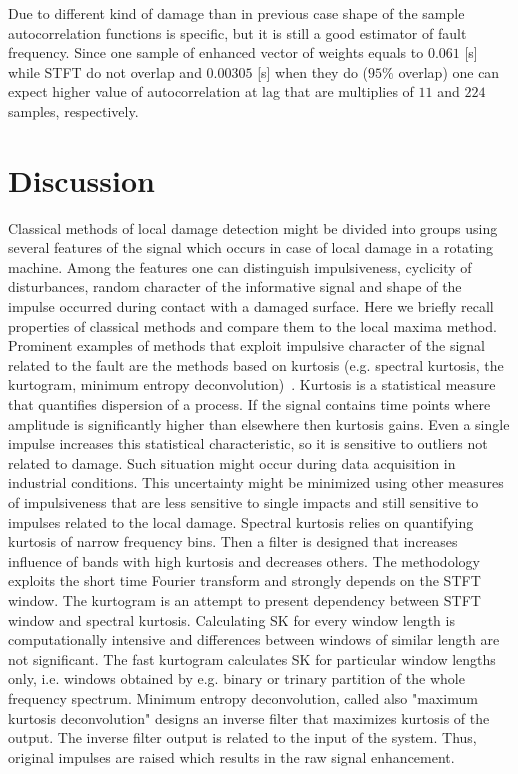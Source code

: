 \documentclass[3p,times]{elsarticle}
\begin{document}
Due to different kind of damage than in previous case shape of the sample autocorrelation functions is specific, but it  is still a good estimator of fault frequency. Since one sample of enhanced vector of weights equals to $0.061$ [s] while STFT do not overlap and $0.00305$ [s] when they do ($95\%$ overlap) one can expect higher value of autocorrelation at lag that are multiplies of $11$ and $224$ samples, respectively.
\section{Discussion}\label{discussion}
Classical methods of local damage detection might be divided into groups using several features of the signal which occurs in case of local damage in a rotating machine. Among the features one can distinguish impulsiveness, cyclicity of disturbances, random character of the informative signal and shape of the impulse occurred during contact with a damaged surface. Here we briefly recall properties of classical methods and compare them to the local maxima method.\\
Prominent examples of methods that exploit impulsive character of the signal related to the fault are the methods based on kurtosis (e.g. spectral kurtosis, the kurtogram, minimum entropy deconvolution)~\cite{bib4,bib5,bib6}. Kurtosis is a statistical measure that quantifies dispersion of a process. If the signal contains time points where amplitude is significantly higher than elsewhere then kurtosis gains. Even a single impulse increases this statistical characteristic, so it is sensitive to outliers not related to damage. Such situation might occur during data acquisition in industrial conditions. This uncertainty might be minimized using other measures of impulsiveness that are less sensitive to single impacts and still sensitive to impulses related to the local damage. Spectral kurtosis relies on quantifying kurtosis of narrow frequency bins. Then a filter is designed that increases influence of bands with high kurtosis and decreases others. The methodology exploits the short time Fourier transform and strongly depends on the STFT window. The kurtogram is an attempt to present dependency between STFT window and spectral kurtosis. Calculating SK for every window length is computationally intensive and differences between windows of similar length are not significant. The fast kurtogram calculates SK for particular window lengths only, i.e. windows obtained by e.g. binary or trinary partition of the whole frequency spectrum. Minimum entropy deconvolution, called also "maximum kurtosis deconvolution" designs an inverse filter that maximizes kurtosis of the output. The inverse filter output is related to the input of the system. Thus, original impulses are raised which results in the raw signal enhancement.\\
\end{document}
